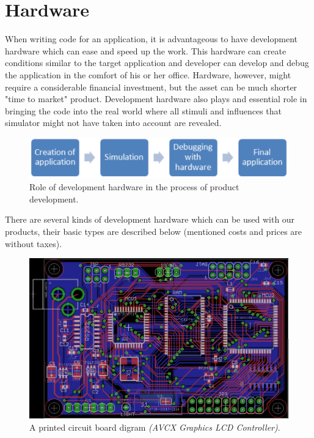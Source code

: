 \documentclass[a4paper,twoside,15pt]{book}
\begin{document}
	\clearpage
	\section{Hardware}
		When writing code for an application, it is advantageous to have development hardware which can ease and speed up the work. This hardware can create conditions similar to the target application and developer can develop and debug the application in the comfort of his or her office. Hardware, however, might require a considerable financial investment, but the asset can be much shorter "time to market" product. Development hardware also plays and essential role in bringing the code into the real world where all stimuli and influences that simulator might not have taken into account are revealed.
		\begin{figure}[h!]
			\centering{}
			\includegraphics[width=.9\textwidth]{images/prvni_obr_pod_hardware.png}
			\caption{Role of development hardware in the process of product development.}
		\end{figure}

		There are several kinds of development hardware which can be used with our products, their basic types are described below (mentioned costs and prices are without taxes).
		\begin{figure}[h!]
			\centering{}
			\includegraphics[width=.7\textwidth]{images/pcb.png}
			\caption{A printed circuit board digram \textit{(AVCX Graphics LCD Controller)}.}
		\end{figure}
\end{document}
